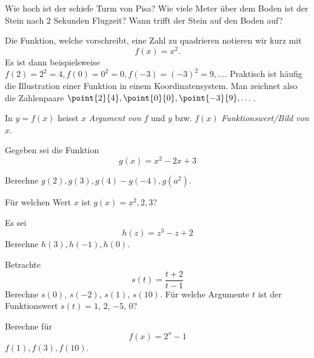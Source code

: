 \documentclass[%
11pt,%
twoside,%
titlepage,%
german,%
headsepline%
]{scrartcl}
\begin{document}
\begin{ueb}
Wie hoch ist der schiefe Turm von Pisa? Wie viele Meter \"uber dem Boden ist der Stein nach $2$ Sekunden Flugzeit? Wann trifft der Stein auf den Boden auf?
\end{ueb}

\begin{bsp}
Die Funktion, welche vorschreibt, eine Zahl zu quadrieren notieren wir kurz mit
$$f(x)=x^2.$$
Es ist dann beispielsweise $f(2)=2^2=4, f(0)=0^2=0, f(-3)=(-3)^2=9,\dots$. Praktisch ist h\"aufig die Illustration einer Funktion in einem Koordinatensystem. Man zeichnet also die Zahlenpaare $\point{2}{4}, \point{0}{0}, \point{-3}{9},\dots$.
\end{bsp}
\begin{bem}
In $y=f(x)$ heisst $x$ \emph{Argument von $f$} und $y$ bzw. $f(x)$ \emph{Funktionswert/Bild von $x$}.
\end{bem}
\begin{ueb}[Schreibweise]
Gegeben sei die Funktion
$$g(x)=x^2-2x+3$$
\begin{enumeratea}
\item Berechne $g(2),g(3),g(4)-g(-4),g(a^2)$.
\item F\"ur welchen Wert $x$ ist $g(x)=x^2,2,3$?
\end{enumeratea}
\end{ueb}
\begin{ueb}[Schreibweise 2]
Es sei
$$h(z)=z^3-z+2$$
Berechne $h(3),h(-1),h(0)$.
\end{ueb}
\begin{ueb}[Schreibweise 3]
Betrachte
$$s(t)=\frac{t+2}{t-1}$$
Berechne $s(0)$, $s(-2)$, $s(1)$, $s(10)$. F\"ur welche Argumente $t$ ist der Funktionswert $s(t)=1$, $2$, $-5$, $0$?
\end{ueb}
\begin{ueb}[Schreibweise 4]
Berechne f\"ur
$$f(x)=2^x-1$$
$f(1),f(3),f(10)$.
\end{ueb}
\end{document}

